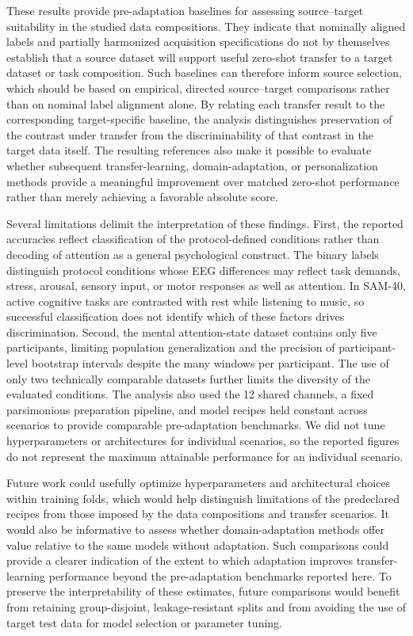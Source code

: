 \documentclass[10pt,letterpaper]{article}
\begin{document}
\medskip

These results provide pre-adaptation baselines for assessing
source--target suitability in the studied data compositions. They indicate that
nominally aligned labels and partially harmonized acquisition specifications do
not by themselves establish that a source dataset will support useful zero-shot
transfer to a target dataset or task composition. Such baselines can therefore
inform source selection, which should be based on empirical, directed
source--target comparisons rather than on nominal label alignment alone. By
relating each transfer result to the corresponding target-specific baseline,
the analysis distinguishes preservation of the contrast under transfer from
the discriminability of that contrast in the target data itself. The resulting
references also make it possible to evaluate whether subsequent
transfer-learning, domain-adaptation, or personalization methods provide a
meaningful improvement over matched zero-shot performance rather than merely
achieving a favorable absolute score.

\medskip

Several limitations delimit the interpretation of these findings. First, the
reported accuracies reflect classification of the protocol-defined conditions
rather than decoding of attention as a general psychological construct. The
binary labels distinguish protocol conditions whose EEG differences may
reflect task demands, stress, arousal, sensory input, or motor responses as
well as attention. In SAM-40, active cognitive tasks are contrasted with rest
while listening to music, so successful classification does not identify
which of these factors drives discrimination. Second, the mental
attention-state dataset contains only five participants, limiting population
generalization and the precision of participant-level bootstrap intervals
despite the many windows per participant. The use of only two technically
comparable datasets further limits the diversity of the evaluated conditions. The analysis also used the 12 shared
channels, a fixed parsimonious preparation pipeline, and model recipes held
constant across scenarios to provide comparable pre-adaptation benchmarks.
We did not tune hyperparameters or architectures for individual scenarios, so
the reported figures do not represent the maximum attainable performance for
an individual scenario.

\medskip

Future work could usefully optimize hyperparameters and architectural choices
within training folds, which would help distinguish limitations of the
predeclared recipes from those imposed by the data compositions and transfer
scenarios. It would also be informative to assess whether domain-adaptation
methods offer value relative to the same models without adaptation. Such
comparisons could provide a clearer indication of the extent to which
adaptation improves transfer-learning performance beyond the pre-adaptation
benchmarks reported here. To preserve the interpretability of these estimates,
future comparisons would benefit from retaining group-disjoint,
leakage-resistant splits and from avoiding the use of target test data for
model selection or parameter tuning.
\end{document}
